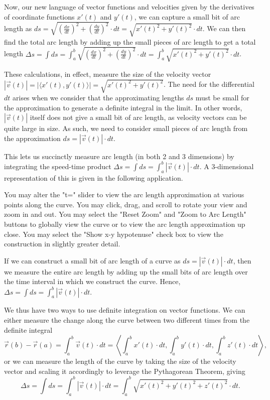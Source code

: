 \documentclass{ximera}
\begin{document}
\begin{center}
\end{center}

Now, our new language of vector functions and velocities given by the derivatives of coordinate functions $x'(t)$ and $y'(t)$, we can capture a small bit of arc length as $ds=\sqrt{\left(\frac{dx}{dt}\right)^2+\left(\frac{dy}{dt}\right)^2}\cdot dt=\sqrt{x'(t)^2+y'(t)^2}\cdot dt$. We can then find the total arc length by adding up the small pieces of arc length to get a total length $\Delta s=\int ds=\int_a^b\sqrt{\left(\frac{dx}{dt}\right)^2+\left(\frac{dy}{dt}\right)^2}\cdot dt=\int_a^b\sqrt{x'(t)^2+y'(t)^2}\cdot dt$.

These calculations, in effect, measure the size of the velocity vector $|\vec{v}(t)|=|\langle x'(t), y'(t)\rangle |=\sqrt{x'(t)^2+y'(t)^2}$. The need for the differential $dt$ arises when we consider that the approximating lengths $ds$ must be small for the approximation to generate a definite integral in the limit. In other words, $|\vec{v}(t)|$ itself does not give a small bit of arc length, as velocity vectors can be quite large in size. As such, we need to consider small pieces of arc length from the approximation $ds=|\vec{v}(t)|\cdot dt$.

This lets us succinctly measure arc length (in both 2 and 3 dimensions) by integrating the speed-time product $\Delta s=\int ds=\int_a^b|\vec{v}(t)|\cdot dt$. A 3-dimensional representation of this is given in the following application.

You may alter the "t=" slider to view the arc length approximation at various points along the curve. You may click, drag, and scroll to rotate your view and zoom in and out. You may select the "Reset Zoom" and "Zoom to Arc Length" buttons to globally view the curve or to view the arc length approximation up close. You may select the "Show x-y hypotenuse" check box to view the construction in slightly greater detail.

\begin{center}
\end{center}

If we can construct a small bit of arc length of a curve as $ds=|\vec{v}(t)|\cdot dt$, then we measure the entire arc length by adding up the small bits of arc length over the time interval in which we construct the curve. Hence, $\Delta s=\int ds=\int_a^b|\vec{v}(t)|\cdot dt$.

We thus have two ways to use definite integration on vector functions. We can either measure the change along the curve between two different times from the definite integral 
$$\vec{r}(b)-\vec{r}(a)= \int_a^b \vec{v}(t)\cdot dt=\left\langle \int_a^b x'(t)\cdot dt, \int_a^b y'(t)\cdot dt, \int_a^b z'(t)\cdot dt\right\rangle,$$
or we can measure the length of the curve by taking the size of the velocity vector and scaling it accordingly to leverage the Pythagorean Theorem, giving 
$$\Delta s=\int ds=\int_a^b|\vec{v}(t)|\cdot dt=\int_a^b\sqrt{x'(t)^2+y'(t)^2+z'(t)^2}\cdot dt.$$
\end{document}
